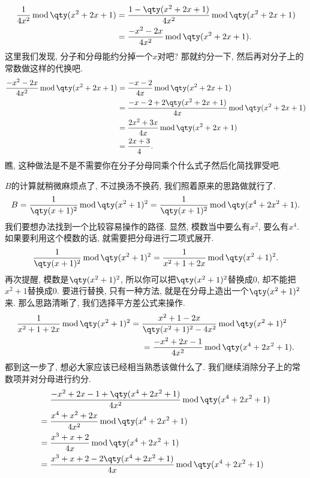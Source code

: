 \documentclass{ctexbook}
\newcommand{\m}{\,\mathrm{mod}\,}
\begin{document}
{\begin{align*}
\frac{1}{4x^{2}}\m\qty(x^{2}+2x+1)={}&\frac{1-\qty(x^{2}+2x+1)}{4x^{2}}\m\qty(x^{2}+2x+1)\\
={}&\frac{-x^{2}-2x}{4x^{2}}\m\qty(x^{2}+2x+1)
.\end{align*}
这里我们发现, 分子和分母能约分掉一个$x$对吧? 那就约分一下, 然后再对分子上的常数做这样的代换吧. 
\begin{align*}
\frac{-x^{2}-2x}{4x^{2}}\m\qty(x^{2}+2x+1)={}&\frac{-x-2}{4x}\m\qty(x^{2}+2x+1)\\
={}&\frac{-x-2+2\qty(x^{2}+2x+1)}{4x}\m\qty(x^{2}+2x+1)\\
={}&\frac{2x^{2}+3x}{4x}\m\qty(x^{2}+2x+1)\\
={}&\frac{2x+3}{4}
.\end{align*}
瞧, 这种做法是不是不需要你在分子分母同乘个什么式子然后化简找罪受吧. \par
$B$的计算就稍微麻烦点了, 不过换汤不换药, 我们照着原来的思路做就行了. 
\begin{align*}
B=\frac{1}{\qty(x+1)^{2}}\m\qty(x^{2}+1)^{2}=\frac{1}{\qty(x+1)^{2}}\m\qty(x^{4}+2x^{2}+1)
.\end{align*}
我们要想办法找到一个比较容易操作的路径. 显然, 模数当中要么有$x^{2}$, 要么有$x^{4}$. 如果要利用这个模数的话, 就需要把分母进行二项式展开. 
\begin{align*}
\frac{1}{\qty(x+1)^{2}}\m\qty(x^{2}+1)^{2}=\frac{1}{x^{2}+1+2x}\m\qty(x^{2}+1)^{2}
.\end{align*}
再次提醒, 模数是$\qty(x^{2}+1)^{2}$, 所以你可以把$\qty(x^{2}+1)^{2}$替换成$0$, 却不能把$x^{2}+1$替换成$0$. 要进行替换, 只有一种方法, 就是在分母上造出一个$\qty(x^{2}+1)^{2}$来. 那么思路清晰了, 我们选择平方差公式来操作. 
\begin{align*}
\frac{1}{x^{2}+1+2x}\m\qty(x^{2}+1)^{2}={}&\frac{x^{2}+1-2x}{\qty(x^{2}+1)^{2}-4x^{2}}\m\qty(x^{2}+1)^{2}\\
{}&=\frac{-x^{2}+2x-1}{4x^{2}}\m\qty(x^{4}+2x^{2}+1)
.\end{align*}
都到这一步了, 想必大家应该已经相当熟悉该做什么了. 我们继续消除分子上的常数项并对分母进行约分. 
\begin{align*}
{}&\frac{-x^{2}+2x-1+\qty(x^{4}+2x^{2}+1)}{4x^{2}}\m\qty(x^{4}+2x^{2}+1)\\
={}&\frac{x^{4}+x^{2}+2x}{4x^{2}}\m\qty(x^{4}+2x^{2}+1)\\
={}&\frac{x^{3}+x+2}{4x}\m\qty(x^{4}+2x^{2}+1)\\
={}&\frac{x^{3}+x+2-2\qty(x^{4}+2x^{2}+1)}{4x}\m\qty(x^{4}+2x^{2}+1)\\

\end{align*}}
\end{document}
